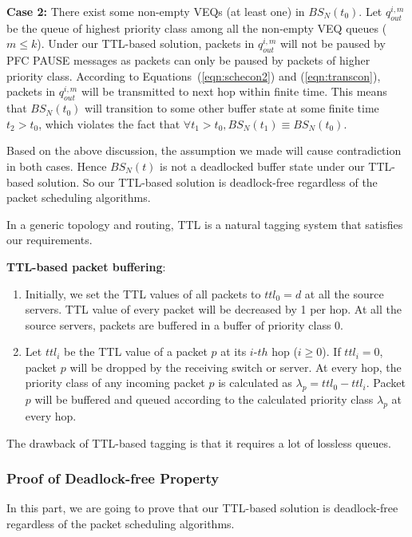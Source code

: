 \textbf{Case 2:} There exist some non-empty VEQs (at least one) in $BS_N(t_0)$. Let $q_{out}^{i,m}$ be the queue of highest priority class among all the non-empty VEQ queues ($m\leq k$). Under our TTL-based solution, packets in $q_{out}^{i,m}$ will not be paused by PFC PAUSE messages as packets can only be paused by packets of higher priority class. According to Equations~(\ref{eqn:schecon2}) and (\ref{eqn:transcon}), packets in $q_{out}^{i,m}$ will be transmitted to next hop within finite time. This means that $BS_N(t_0)$ will transition to some other buffer state  at some finite time $t_2>t_0$, which violates the fact that $\forall t_1>t_0, BS_N(t_1)\equiv BS_N(t_0)$.

Based on the above discussion, the assumption we made will cause contradiction in both cases. Hence $BS_N(t)$ is not a deadlocked buffer state under our TTL-based solution. So our TTL-based solution is deadlock-free regardless of the packet scheduling algorithms.


 In a generic topology and routing, TTL is a natural tagging system that satisfies our requirements.


\textbf{TTL-based packet buffering}: 
\begin{enumerate}
	\item  Initially, we set the TTL values of all packets to $ttl_0=d$ at all the source servers. TTL value of every packet will be decreased by 1 per hop. At all the source servers, packets are buffered in a buffer of priority class $0$.
	
	\item Let $ttl_i$ be the TTL value of a packet $p$ at its $i$-$th$ hop ($i \geq 0$). If $ttl_i = 0$, packet $p$ will be dropped by the receiving switch or server. At every hop, the priority class of any incoming packet $p$ is calculated as $\lambda_p = ttl_0 - ttl_i $. Packet $p$ will be buffered and queued according to the calculated priority class $\lambda_p$ at every hop.
\end{enumerate}
  
The drawback of TTL-based tagging is that it requires a lot of lossless queues. 

\subsubsection{Proof of Deadlock-free Property}\label{subsec:proof}
In this part, we are going to prove that our TTL-based solution is deadlock-free regardless of the packet scheduling algorithms.

